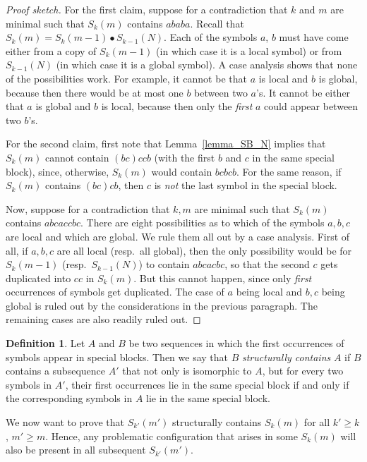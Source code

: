 \documentclass[11pt]{article}
\theoremstyle{definition}
\newtheorem{definition}[theorem]{Definition}
\theoremstyle{remark}
\begin{document}
\begin{proof}[Proof sketch]
For the first claim, suppose for a contradiction that $k$ and $m$ are minimal such that $S_k(m)$ contains $ababa$. Recall that $S_k(m) = S_k(m-1)\bullet S_{k-1}(N)$. Each of the symbols $a$, $b$ must have come either from a copy of $S_k(m-1)$ (in which case it is a local symbol) or from $S_{k-1}(N)$ (in which case it is a global symbol). A case analysis shows that none of the possibilities work. For example, it cannot be that $a$ is local and $b$ is global, because then there would be at most one $b$ between two $a$'s. It cannot be either that $a$ is global and $b$ is local, because then only the \emph{first} $a$ could appear between two $b$'s.

For the second claim, first note that Lemma~\ref{lemma_SB_N} implies that $S_k(m)$ cannot contain $(bc)ccb$ (with the first $b$ and $c$ in the same special block), since, otherwise, $S_k(m)$ would contain $bcbcb$. For the same reason, if $S_k(m)$ contains $(bc)cb$, then $c$ is \emph{not} the last symbol in the special block.

Now, suppose for a contradiction that $k,m$ are minimal such that $S_k(m)$ contains $abcaccbc$. There are eight possibilities as to which of the symbols $a,b,c$ are local and which are global. We rule them all out by a case analysis. First of all, if $a,b,c$ are all local (resp.~all global), then the only possibility would be for $S_k(m-1)$ (resp.~$S_{k-1}(N)$) to contain $abcacbc$, so that the second $c$ gets duplicated into $cc$ in $S_k(m)$. But this cannot happen, since only \emph{first} occurrences of symbols get duplicated. The case of $a$ being local and $b,c$ being global is ruled out by the considerations in the previous paragraph. The remaining cases are also readily ruled out.
\end{proof}

\begin{definition}\label{def_structurally}
Let $A$ and $B$ be two sequences in which the first occurrences of symbols appear in special blocks. Then we say that $B$ \emph{structurally contains} $A$ if $B$ contains a subsequence $A'$ that not only is isomorphic to $A$, but for every two symbols in $A'$, their first occurrences lie in the same special block if and only if the corresponding symbols in $A$ lie in the same special block.
\end{definition}

We now want to prove that $S_{k'}(m')$ structurally contains $S_k(m)$ for all $k'\ge k$, $m'\ge m$. Hence, any problematic configuration that arises in some $S_k(m)$ will also be present in all subsequent $S_{k'}(m')$.
\end{document}
